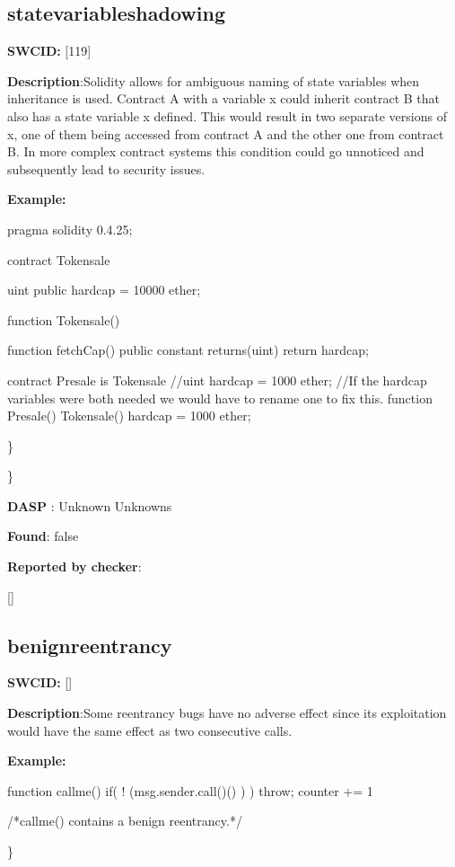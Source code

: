 \documentclass{article}
\begin{document}
\subsection{state{\textunderscore}variable{\textunderscore}shadowing} 
\textbf{SWC{\textunderscore}ID:} [119]

\textbf{Description}:Solidity allows for ambiguous naming of state variables when inheritance is used. Contract A with a variable x could inherit contract B that also has a state variable x defined. This would result in two separate versions of x, one of them being accessed from contract A and the other one from contract B. In more complex contract systems this condition could go unnoticed and subsequently lead to security issues.


\textbf{Example:} 
\begin{ffcode} 

pragma solidity 0.4.25;

contract Tokensale {
    uint public hardcap = 10000 ether;

    function Tokensale() {}

    function fetchCap() public constant returns(uint) {
        return hardcap;
    }
}

contract Presale is Tokensale {
    //uint hardcap = 1000 ether;
    //If the hardcap variables were both needed we would have to rename one to fix this.
    function Presale() Tokensale() {
        hardcap = 1000 ether;
    }
}

\end{ffcode} 
\} 

\} 

\textbf{DASP} : Unknown Unknowns

\textbf{Found}: false

\textbf{Reported by checker}: 
\begin{ffcode} 

[]
\end{ffcode} 
\subsection{benign{\textunderscore}reentrancy} 
\textbf{SWC{\textunderscore}ID:} []

\textbf{Description}:Some re{\textendash}entrancy bugs have no adverse effect since its exploitation would have the same effect as two consecutive calls.


\textbf{Example:} 
\begin{ffcode} 

function callme(){
  if( ! (msg.sender.call()() ) ){
    throw;
  }
  counter += 1
}

 /*callme() contains a benign reentrancy.*/ 

\end{ffcode} 
\} 
\end{document}
